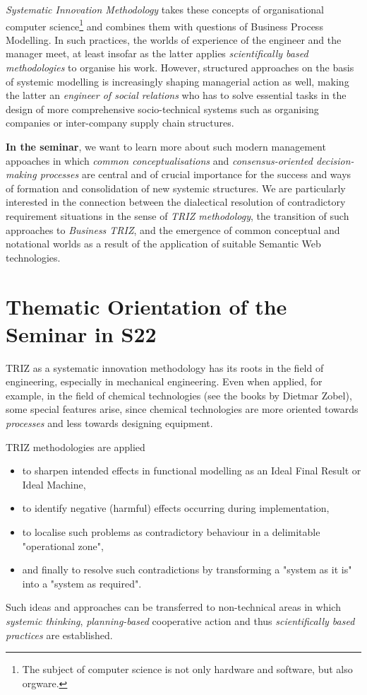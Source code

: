 \documentclass[11pt,a4paper]{article}
\begin{document}
\emph{Systematic Innovation Methodology} takes these concepts of
organisational computer science\footnote{The subject of computer science is
  not only hardware and software, but also orgware.} and combines them with
questions of Business Process Modelling. In such practices, the worlds of
experience of the engineer and the manager meet, at least insofar as the
latter applies \emph{scientifically based methodologies} to organise his work.
However, structured approaches on the basis of systemic modelling is
increasingly shaping managerial action as well, making the latter an
\emph{engineer of social relations} who has to solve essential tasks in the
design of more comprehensive socio-technical systems such as organising
companies or inter-company supply chain structures.

\textbf{In the seminar}, we want to learn more about such modern management
appoaches in which \emph{common conceptualisations} and
\emph{consensus-oriented decision-making processes} are central and of crucial
importance for the success and ways of formation and consolidation of new
systemic structures.  We are particularly interested in the connection between
the dialectical resolution of contradictory requirement situations in the
sense of \emph{TRIZ methodology}, the transition of such approaches to
\emph{Business TRIZ}, and the emergence of common conceptual and notational
worlds as a result of the application of suitable Semantic Web technologies.

\section{Thematic Orientation of the Seminar in S22}

TRIZ as a systematic innovation methodology has its roots in the field of
engineering, especially in mechanical engineering. Even when applied, for
example, in the field of chemical technologies (see the books by Dietmar
Zobel), some special features arise, since chemical technologies are more
oriented towards \emph{processes} and less towards designing equipment.

TRIZ methodologies are applied 
\begin{itemize}
\item to sharpen intended effects in functional modelling as an Ideal Final
  Result or Ideal Machine,
\item to identify negative (harmful) effects occurring during implementation, 
\item to localise such problems as contradictory behaviour in a delimitable
  "operational zone", 
\item and finally to resolve such contradictions by transforming a "system as
  it is" into a "system as required".
\end{itemize}
Such ideas and approaches can be transferred to non-technical areas in which
\emph{systemic thinking}, \emph{planning-based} cooperative action and thus
\emph{scientifically based practices} are established.
\end{document}
